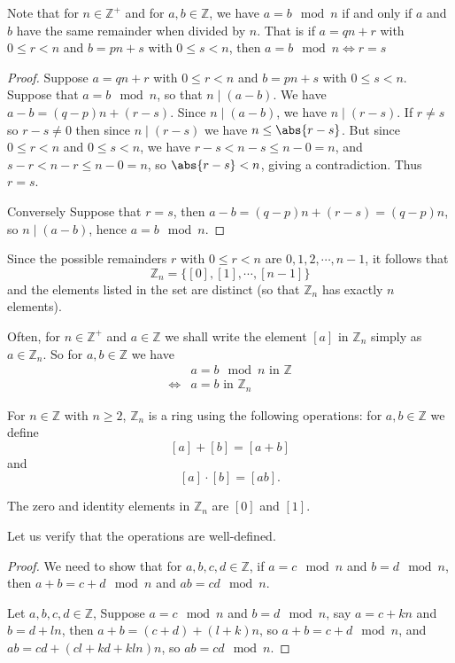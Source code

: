 \begin{rem}
Note that for $n\in\mathbb{Z}^+$ and for $a,b\in\mathbb{Z}$, we have $a=b \mod  n$ if and only if $a$ and $b$ have the same remainder when divided by $n$. That is if $a = qn+r$ with $0\leq r < n$ and $b = pn+s$ with $0\leq s < n$, then $a= b \mod  n \Longleftrightarrow r=s$
\end{rem}
\begin{proof}
Suppose $a = qn+r$ with $0\leq r < n$ and $b = pn+s$ with $0\leq s < n$. Suppose that $a=b \mod  n$, so that $n\mid (a-b)$. We have $a-b = (q-p)n + (r-s)$. Since $n\mid (a-b)$, we have $n\mid (r-s)$. If $r\neq s$ so $r-s \neq 0$ then since $n\mid (r-s)$ we have $n\leq \abs{r-s}$. But since $0\leq r < n$ and $0\leq s < n$, we have $r-s < n-s \leq n-0 = n$, and $s-r <n-r \leq n-0 = n$, so $\abs{r-s} < n$, giving a contradiction. Thus $r=s$.

Conversely Suppose that $r=s$, then $a-b = (q-p)n + (r-s) = (q-p)n$, so $n\mid (a-b)$, hence $a=b \mod  n$.
\end{proof}

Since the possible remainders $r$ with $0\leq r < n$ are $0,1,2,\cdots , n-1$, it follows that \[\mathbb{Z}_n = \{[0],[1],\cdots ,[n-1]\}\] and the elements listed in the set are distinct (so that $\mathbb{Z}_n$ has exactly $n$ elements).

Often, for $n\in\mathbb{Z}^+$ and $a\in\mathbb{Z}$ we shall write the element $[a]$ in $\mathbb{Z}_n$ simply as $a\in \mathbb{Z}_n$. So for $a,b\in\mathbb{Z}$ we have 
\begin{align*}
    & a = b \mod n \text{ in }\mathbb{Z} \\
    \Longleftrightarrow & a = b \text{ in }\mathbb{Z}_n
\end{align*}

\begin{thm}
For $n\in\mathbb{Z}$ with $n\geq 2$, $\mathbb{Z}_n$ is a ring using the following operations: for $a,b\in\mathbb{Z}$ we define \[[a] + [b] = [a+b]\] and \[[a]\cdot [b] = [ab].\] 

The zero and identity elements in $\mathbb{Z}_n$ are $[0]$ and $[1]$.
\end{thm}

Let us verify that the operations are well-defined.
\begin{proof}
We need to show that for $a,b,c,d\in\mathbb{Z}$, if $a=c \mod n$ and $b = d \mod n$, then $a+b = c + d \mod n$ and $ab = cd \mod n$.

Let $a,b,c,d \in\mathbb{Z}$, Suppose $a=c \mod n$ and $b = d \mod n$, say $a=c+kn$ and $b = d+ln$, then $a+b = (c+d) + (l+k)n$, so $a+b = c + d \mod n$, and $ab = cd + (cl+kd+kln)n$, so $ab = cd \mod n$.
\end{proof}

